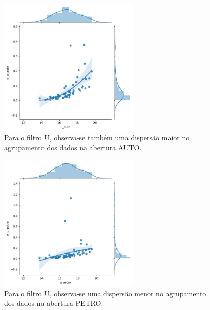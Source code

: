 \begin{figure}
  \centering 
  \includegraphics[width=0.6\textwidth]{Imagens/auto_linear.png} 
  \caption[Agrupamento das galáxias em relação à medição da magnitude e erro para a abertura AUTO no filtro U.]{Para o filtro U, observa-se também uma dispersão maior no agrupamento dos dados na abertura AUTO.}
  \label{fig:auto_linear} 
\end{figure}

\begin{figure}[t]
  \centering 
  \includegraphics[width=0.6\textwidth]{Imagens/petro_linear.png} 
  \caption[Agrupamento das galáxias em relação à medição da magnitude e erro para a abertura PETRO no filtro U.]{Para o filtro U, observa-se uma dispersão menor no agrupamento dos dados na abertura PETRO.}
  \label{fig:petro_linear} 
\end{figure}